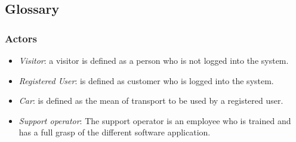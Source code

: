 \documentclass[12pt]{article}
\begin{document}
	 
	\subsection{\label{actors:3}Glossary}
	 
	 \subsubsection{Actors}
     \begin{itemize}
 	 	\item \textit{Visitor}: a visitor is defined as a person who is not logged into the 	
 	 				 system.
  		\item \textit{Registered User}: is defined as customer who is  logged into the system.
  		
  		\item \textit{Car}: is defined as the mean of transport to be used by a registered 
  					 user.
  		\item \textit{Support operator}: The support operator is an employee who is trained and 
  					 has a full grasp of the different software application.
	\end{itemize}
	
\end{document}
